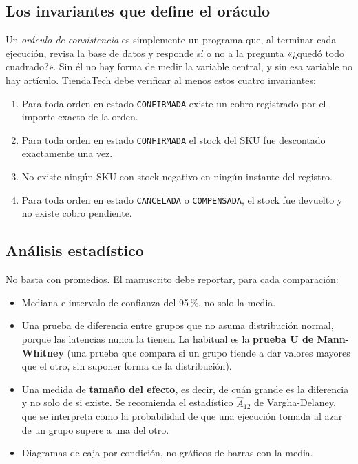 \documentclass[11pt,a4paper]{article}
\begin{document}
\subsection{Los invariantes que define el oráculo}

Un \emph{oráculo de consistencia} es simplemente un programa que, al terminar cada ejecución, revisa la base de datos y responde sí o no a la pregunta «¿quedó todo cuadrado?». Sin él no hay forma de medir la variable central, y sin esa variable no hay artículo. TiendaTech debe verificar al menos estos cuatro invariantes:

\begin{enumerate}[leftmargin=*,itemsep=3pt]
	\item Para toda orden en estado \texttt{CONFIRMADA} existe un cobro registrado por el importe exacto de la orden.
	\item Para toda orden en estado \texttt{CONFIRMADA} el stock del SKU fue descontado exactamente una vez.
	\item No existe ningún SKU con stock negativo en ningún instante del registro.
	\item Para toda orden en estado \texttt{CANCELADA} o \texttt{COMPENSADA}, el stock fue devuelto y no existe cobro pendiente.
\end{enumerate}

\subsection{Análisis estadístico}

No basta con promedios. El manuscrito debe reportar, para cada comparación:

\begin{itemize}[leftmargin=*,itemsep=4pt]
	\item Mediana e intervalo de confianza del 95\,\%, no solo la media.
	\item Una prueba de diferencia entre grupos que no asuma distribución normal, porque las latencias nunca la tienen. La habitual es la \textbf{prueba U de Mann-Whitney} (una prueba que compara si un grupo tiende a dar valores mayores que el otro, sin suponer forma de la distribución).
	\item Una medida de \textbf{tamaño del efecto}, es decir, de cuán grande es la diferencia y no solo de si existe. Se recomienda el estadístico $\hat{A}_{12}$ de Vargha-Delaney, que se interpreta como la probabilidad de que una ejecución tomada al azar de un grupo supere a una del otro.
	\item Diagramas de caja por condición, no gráficos de barras con la media.
\end{itemize}
\end{document}
